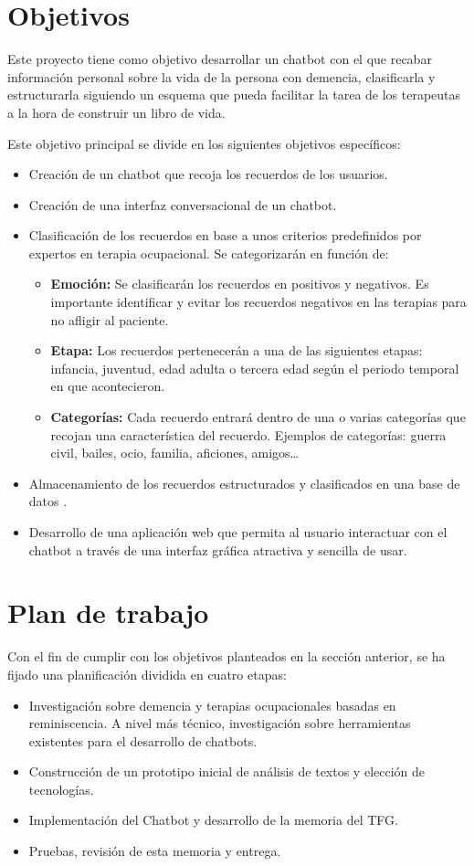 \section{Objetivos}

Este proyecto tiene como objetivo desarrollar un chatbot con el que recabar información personal sobre la vida de la persona con demencia, clasificarla y estructurarla siguiendo un esquema que pueda facilitar la tarea de los terapeutas a la hora de construir un libro de vida. 

Este objetivo principal se divide en los siguientes objetivos específicos:
\begin{itemize}
	\item Creación de un chatbot que recoja los recuerdos de los usuarios.
	\item Creación de una interfaz conversacional de un chatbot.
	\item Clasificación de los recuerdos en base a unos criterios predefinidos por expertos en terapia ocupacional. Se categorizarán en función de: 
	\begin{itemize}
		\item \textbf{Emoción:} Se clasificarán los recuerdos en positivos y negativos. Es importante identificar y evitar los recuerdos negativos en las terapias para no afligir al paciente. 
		\item \textbf{Etapa:} Los recuerdos pertenecerán a una de las siguientes etapas: infancia, juventud, edad adulta o tercera edad según el periodo temporal en que acontecieron.
		\item \textbf{Categorías:} Cada recuerdo entrará dentro de una o varias categorías que recojan una característica del recuerdo. Ejemplos de categorías: guerra civil, bailes, ocio, familia, aficiones, amigos…
	\end{itemize}
	\item Almacenamiento de los recuerdos estructurados y clasificados en una base de datos .
	\item Desarrollo de una aplicación web que permita al usuario interactuar con el chatbot a través de una interfaz gráfica atractiva y sencilla de usar.
\end{itemize}


\section{Plan de trabajo}

Con el fin de cumplir con los objetivos planteados en la sección anterior, se ha fijado una planificación dividida en cuatro etapas:
\begin{itemize}
	\item Investigación sobre demencia y terapias ocupacionales basadas en reminiscencia. A nivel más técnico, investigación sobre herramientas existentes para el desarrollo de chatbots.
	\item Construcción de un prototipo inicial de análisis de textos y elección de tecnologías.
	\item Implementación del Chatbot y desarrollo de la memoria del TFG.
	\item Pruebas, revisión de esta memoria y entrega.	
\end{itemize}

